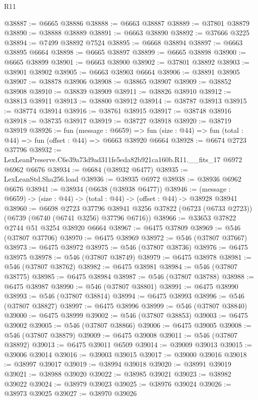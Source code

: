\begin{lexlean}{R11}
\begin{coremodule}
@38887 := @6665 @38886
@38888 := @6663 @38887
@38889 := @37801 @38879
@38890 := @38888 @38889
@38891 := @6663 @38890
@38892 := @37666 @3225
@38894 := @7499 @38892 @7524
@38895 := @6668 @38894
@38897 := @6663 @38895 @6664
@38898 := @6665 @38897
@38899 := @6665 @38898
@38900 := @6665 @38899
@38901 := @6663 @38900
@38902 := @37801 @38892
@38903 := @38901 @38902
@38905 := @6663 @38903 @6664
@38906 := @38891 @38905
@38907 := @38878 @38906
@38908 := @38865 @38907
@38909 := @38852 @38908
@38910 := @38839 @38909
@38911 := @38826 @38910
@38912 := @38813 @38911
@38913 := @38800 @38912
@38914 := @38787 @38913
@38915 := @38774 @38914
@38916 := @38761 @38915
@38917 := @38748 @38916
@38918 := @38735 @38917
@38919 := @38727 @38918
@38920 := @38719 @38919
@38926 := fun (message : @6659) =>
  fun (size : @44) => fun (total : @44) => fun (offset : @44) => @6663 @38920 @6664
@38928 := @6674 @2723 @37796
@38932 := LexLeanPreserve.C6e39a73d9ad311fe5eda82b921ca160b.R11.__fits_17 @6972 @6962 @6676
@38934 := @6684 (@38932 @6477)
@38935 := LexLeanStd.Sha256.load
@38936 := @38935 @6972
@38938 := @38936 @6962 @6676
@38941 := @38934 (@6638 (@38938 @6477))
@38946 := (message : @6659) -> (size : @44) -> (total : @44) -> (offset : @44) -> @38928 @38941
@38960 := @6698
    @2723
    @37796
    @38941
    @3256
    @37822
    (@6723 (@6733 @2723))
    (@6739 (@6740 (@6741 @3256) @37796 @6716))
@38966 := @33653 @37822 @2744 @51 @3254 @38920 @6664
@38967 := @6475 @37809
@38969 := @546 (@37807 @37706)
@38970 := @6475 @38969
@38972 := @546 (@37807 @37667)
@38973 := @6475 @38972
@38975 := @546 (@37807 @38736)
@38976 := @6475 @38975
@38978 := @546 (@37807 @38749)
@38979 := @6475 @38978
@38981 := @546 (@37807 @38762)
@38982 := @6475 @38981
@38984 := @546 (@37807 @38775)
@38985 := @6475 @38984
@38987 := @546 (@37807 @38788)
@38988 := @6475 @38987
@38990 := @546 (@37807 @38801)
@38991 := @6475 @38990
@38993 := @546 (@37807 @38814)
@38994 := @6475 @38993
@38996 := @546 (@37807 @38827)
@38997 := @6475 @38996
@38999 := @546 (@37807 @38840)
@39000 := @6475 @38999
@39002 := @546 (@37807 @38853)
@39003 := @6475 @39002
@39005 := @546 (@37807 @38866)
@39006 := @6475 @39005
@39008 := @546 (@37807 @38879)
@39009 := @6475 @39008
@39011 := @546 (@37807 @38892)
@39013 := @6475 @39011 @6509
@39014 := @39009 @39013
@39015 := @39006 @39014
@39016 := @39003 @39015
@39017 := @39000 @39016
@39018 := @38997 @39017
@39019 := @38994 @39018
@39020 := @38991 @39019
@39021 := @38988 @39020
@39022 := @38985 @39021
@39023 := @38982 @39022
@39024 := @38979 @39023
@39025 := @38976 @39024
@39026 := @38973 @39025
@39027 := @38970 @39026

\end{coremodule}
\end{lexlean}
